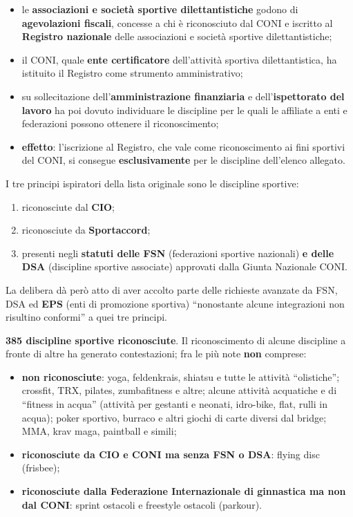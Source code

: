
\begin{itemize}
  \item le \textbf{associazioni e società sportive dilettantistiche} godono di \textbf{agevolazioni
    fiscali}, concesse a chi è riconosciuto dal CONI e iscritto al \textbf{Registro nazionale}
    delle associazioni e società sportive dilettantistiche;
  \item il CONI, quale \textbf{ente certificatore} dell'attività sportiva dilettantistica, ha
    istituito il Registro come strumento amministrativo;
  \item su sollecitazione dell'\textbf{amministrazione finanziaria} e dell'\textbf{ispettorato del
    lavoro} ha poi dovuto individuare le discipline per le quali le affiliate a enti e federazioni
    possono ottenere il riconoscimento;
  \item \textbf{effetto}: l'iscrizione al Registro, che vale come riconoscimento ai fini sportivi
    del CONI, si consegue \textbf{esclusivamente} per le discipline dell'elenco allegato.
\end{itemize}


I tre principi ispiratori della lista originale sono le discipline sportive:
\begin{enumerate}
  \item riconosciute dal \textbf{CIO};
  \item riconosciute da \textbf{Sportaccord};
  \item presenti negli \textbf{statuti delle FSN} (federazioni sportive nazionali) \textbf{e delle
    DSA} (discipline sportive associate) approvati dalla Giunta Nazionale CONI.
\end{enumerate}

La delibera dà però atto di aver accolto parte delle richieste avanzate da FSN, DSA ed \textbf{EPS}
(enti di promozione sportiva) ``nonostante alcune integrazioni non risultino conformi'' a quei tre
principi.


\textbf{385 discipline sportive riconosciute}. Il riconoscimento di alcune discipline a fronte di
altre ha generato contestazioni; fra le più note \textbf{non} comprese:

\begin{itemize}
  \item \textbf{non riconosciute}: yoga, feldenkrais, shiatsu e tutte le attività ``olistiche'';
    crossfit, TRX, pilates, zumbafitness e altre; alcune attività acquatiche e di ``fitness in
    acqua'' (attività per gestanti e neonati, idro-bike, flat, rulli in acqua); poker sportivo,
    burraco e altri giochi di carte diversi dal bridge; MMA, krav maga, paintball e simili;
  \item \textbf{riconosciute da CIO e CONI ma senza FSN o DSA}: flying disc (frisbee);
  \item \textbf{riconosciute dalla Federazione Internazionale di ginnastica ma non dal CONI}:
    sprint ostacoli e freestyle ostacoli (parkour).
\end{itemize}

